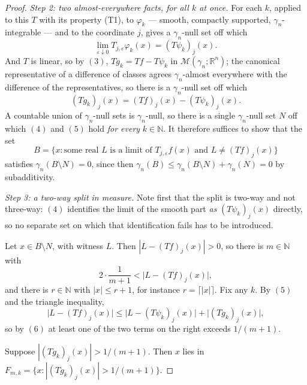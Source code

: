 \begin{proof}
\emph{Step 2: two almost-everywhere facts, for all $k$ at once.}
For each $k$,  applied to this $T$ with its
property (T1), to $\varphi_k$ --- smooth, compactly supported,
$\gamma_n$-integrable --- and to the coordinate $j$, gives a $\gamma_n$-null
set off which
\begin{equation*}
  \lim_{\varepsilon\downarrow0}T_{j,\varepsilon}\varphi_k(x)
    = (T\psi_k)_j(x) . \tag{4}
\end{equation*}
And $T$ is linear, so by $(3)$, $Tg_k = Tf - T\psi_k$ in
$\mathcal{M}(\gamma_n;\mathbb{R}^n)$; the canonical representative of a
difference of classes agrees $\gamma_n$-almost everywhere with the difference
of the representatives, so there is a $\gamma_n$-null set off which
\begin{equation*}
  (Tg_k)_j(x) = (Tf)_j(x) - (T\psi_k)_j(x) . \tag{5}
\end{equation*}
A countable union of $\gamma_n$-null sets is $\gamma_n$-null, so there is a
single $\gamma_n$-null set $N$ off which $(4)$ and $(5)$ hold \emph{for every}
$k \in \mathbb{N}$.  It therefore suffices to show that the set
\[
  B = \bigl\{x : \text{some real } L \text{ is a limit of }
     T_{j,\varepsilon}f(x) \text{ and } L \neq (Tf)_j(x)\bigr\}
\]
satisfies $\gamma_n(B \setminus N) = 0$, since then
$\gamma_n(B) \leq \gamma_n(B\setminus N) + \gamma_n(N) = 0$ by subadditivity.

\emph{Step 3: a two-way split in measure.}
Note first that the split is two-way and not three-way: $(4)$ identifies the
limit of the smooth part \emph{as} $(T\psi_k)_j(x)$ directly, so no separate
set on which that identification fails has to be introduced.

Let $x \in B \setminus N$, with witness $L$.  Then
$|L - (Tf)_j(x)| > 0$, so there is $m \in \mathbb{N}$ with
\begin{equation*}
  2\cdot\frac1{m+1} < \bigl|L - (Tf)_j(x)\bigr| , \tag{6}
\end{equation*}
and there is $r \in \mathbb{N}$ with $|x| \leq r+1$, for instance
$r = \lceil|x|\rceil$.  Fix any $k$.  By $(5)$ and the triangle inequality,
\[
  \bigl|L - (Tf)_j(x)\bigr|
    \leq \bigl|L - (T\psi_k)_j(x)\bigr| + \bigl|(Tg_k)_j(x)\bigr| ,
\]
so by $(6)$ at least one of the two terms on the right exceeds $1/(m+1)$.

Suppose $|(Tg_k)_j(x)| > 1/(m+1)$.  Then $x$ lies in
$F_{m,k} = \{x : |(Tg_k)_j(x)| > 1/(m+1)\}$.


\end{proof}
